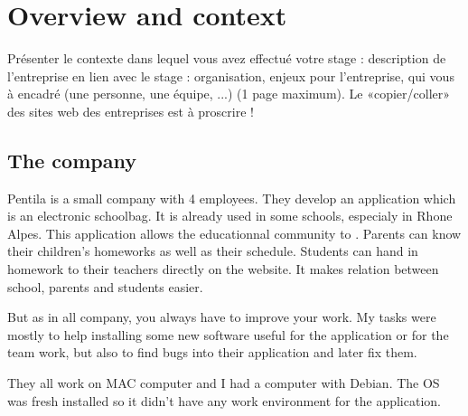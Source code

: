 
\section{Overview and context}

Présenter le contexte dans lequel vous avez effectué votre stage : description de l’entreprise en lien avec le stage : organisation, enjeux pour l’entreprise, qui vous à encadré (une personne, une équipe, ...) (1 page maximum). Le «copier/coller» des sites web des entreprises est à proscrire !

\subsection{The company}

Pentila is a small company with 4 employees. They develop an application which is an electronic schoolbag. 
It is already used in some schools, especialy in Rhone Alpes. 
This application allows the educationnal community to . Parents can know their children's homeworks as well as their schedule. Students can hand in homework to their teachers directly on the website. It makes relation between school, parents and students easier. 

But as in all company, you always have to improve your work. My tasks were mostly to help installing some new software useful for the application or for the team work, but also to find bugs into their application and later fix them.  

They all work on MAC computer and I had a computer with Debian. The OS was fresh installed so it didn't have any work environment for the application. 





